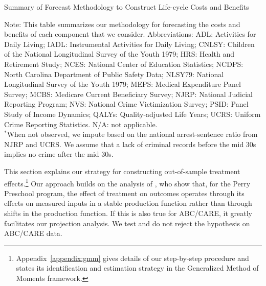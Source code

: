 \begin{table}
\begin{threeparttable}
\caption{Summary of Forecast Methodology to Construct Life-cycle Costs and Benefits} \label{table:sources}
\tiny

\begin{tablenotes}
\scriptsize
Note: This table summarizes our methodology for forecasting the costs and benefits of each component that we consider. Abbreviations: ADL: Activities for Daily Living; IADL: Instrumental Activities for Daily Living; CNLSY: Children of the National Longitudinal Survey of the Youth 1979;  HRS: Health and Retirement Study; NCES: National Center of Education Statistics; NCDPS: North Carolina Department of Public Safety Data; NLSY79: National Longitudinal Survey of the Youth 1979; MEPS: Medical Expenditure Panel Survey; MCBS: Medicare Current Beneficiary Survey; NJRP: National Judicial Reporting Program; NVS: National Crime Victimization Survey; PSID: Panel Study of Income Dynamics; QALYs: Quality-adjusted Life Years; UCRS: Uniform Crime Reporting Statistics. N/A: not applicable. \\
$^*$When not observed, we impute based on the national arrest-sentence ratio  from NJRP and UCRS. We assume that a lack of criminal records before the mid 30s implies no crime after the mid 30s. \\
\end{tablenotes}
\end{threeparttable}
\end{table}

This section explains our strategy for constructing out-of-sample treatment effects.\footnote{ Appendix~\ref{appendix:gmm} gives details of our step-by-step procedure and states its identification and estimation strategy in the Generalized Method of Moments framework.} Our approach builds on the analysis of \citet{Heckman_Pinto_etal_2013_PerryFactor}, who show that, for the Perry Preschool program, the effect of treatment on outcomes operates through its effects on measured inputs in a stable production function rather than through shifts in the production function. If this is also true for ABC/CARE, it greatly facilitates our projection analysis. We test and do not reject the hypothesis on ABC/CARE data.

